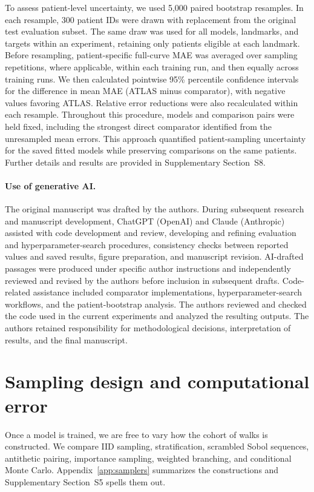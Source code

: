 To assess patient-level uncertainty, we used 5,000 paired bootstrap resamples. In each resample, 300 patient IDs were drawn with replacement from the original test evaluation subset. The same draw was used for all models, landmarks, and targets within an experiment, retaining only patients eligible at each landmark. Before resampling, patient-specific full-curve MAE was averaged over sampling repetitions, where applicable, within each training run, and then equally across training runs. We then calculated pointwise 95\% percentile confidence intervals for the difference in mean MAE (ATLAS minus comparator), with negative values favoring ATLAS. Relative error reductions were also recalculated within each resample. Throughout this procedure, models and comparison pairs were held fixed, including the strongest direct comparator identified from the unresampled mean errors. This approach quantified patient-sampling uncertainty for the saved fitted models while preserving comparisons on the same patients. Further details and results are provided in Supplementary Section~S8.

\paragraph{Use of generative AI.}\label{sec:aiuse}
The original manuscript was drafted by the authors. During subsequent research and manuscript development, ChatGPT (OpenAI) and Claude (Anthropic) assisted with code development and review, developing and refining evaluation and hyperparameter-search procedures, consistency checks between reported values and saved results, figure preparation, and manuscript revision. AI-drafted passages were produced under specific author instructions and independently reviewed and revised by the authors before inclusion in subsequent drafts. Code-related assistance included comparator implementations, hyperparameter-search workflows, and the patient-bootstrap analysis. The authors reviewed and checked the code used in the current experiments and analyzed the resulting outputs. The authors retained responsibility for methodological decisions, interpretation of results, and the final manuscript.

\section{Sampling design and computational error}\label{sec:sampling}
Once a model is trained, we are free to vary how the cohort of walks is constructed. We compare IID sampling, stratification, scrambled Sobol sequences, antithetic pairing, importance sampling, weighted branching, and conditional Monte Carlo. Appendix~\ref{app:samplers} summarizes the constructions and Supplementary Section~S5 spells them out.


